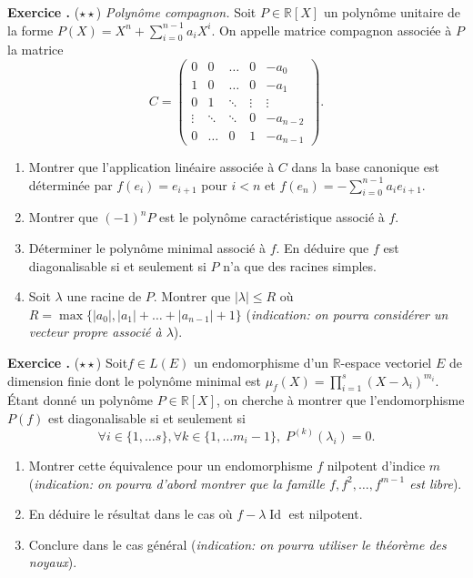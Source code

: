\documentclass[10pt,a4paper]{article}
\def\bf#1{\textbf{#1}}
\newcounter{nexo}
\newcommand{\exo}{\medskip\noindent \bf{ Exercice \thenexo. \stepcounter{nexo}}}
\def\be{\begin{enumerate}}
\def\ee{\end{enumerate}}
\def\R{\mathbb{R}}
\def\mat#1{\begin{pmatrix}#1\end{pmatrix}}
\DeclareMathOperator{\Id}{Id}
\begin{document}
\exo($\star \star$) \emph{Polynôme compagnon.}
Soit $P \in \R[X]$ un polynôme unitaire de la forme $P(X) = X^n+ \sum_{i=0}^{n-1} a_i X^i$. 
On appelle matrice compagnon associée à $P$ la matrice 
\[C =  \mat{
0 & 0 & \ldots & 0 & -a_0\\
1 & 0&   \ldots & 0&-a_1\\
0 & 1&  \ddots  &  \vdots  &\vdots\\
\vdots & \ddots & \ddots & 0 & -a_{n-2}\\
0& \ldots & 0 &1&-a_{n-1}}.\]
\be
\item
Montrer que l'application linéaire associée à $C$ dans la base canonique est déterminée par $f(e_i) = e_{i+1}$ pour $i<n$ et $f(e_n) = - \sum_{i=0}^{n-1} a_i e_{i+1}$.
\item 
Montrer que $(-1)^n P$ est le polynôme caractéristique associé à $f$.
\item
Déterminer le polynôme minimal associé à $f$. En déduire que $f$ est diagonalisable si et seulement si $P$ n'a que des racines simples.
\item 
Soit $\lambda$ une racine de $P$. Montrer que $|\lambda| \leq R$ où $R = \max\{|a_0|,|a_1|+\ldots+|a_{n-1}|+1\}$ (\emph{indication: on pourra considérer un 
vecteur propre associé à $\lambda$}).
\ee

\exo($\star \star$)
Soit$f \in L(E)$ un endomorphisme d'un $\R$-espace vectoriel $E$ de dimension finie dont le polynôme minimal est $\mu_f(X) = \prod_{i=1}^s(X-\lambda_i)^{m_i}$. 
\'Etant donné un polynôme $P \in \R[X]$, on cherche à montrer que l'endomorphisme $P(f)$ est diagonalisable si et seulement si 
\[\forall i\in \{1, \ldots s\}, \forall k\in \{1, \ldots m_i-1\}, \; P^{(k)}(\lambda_i) = 0.\]
 \be
\item Montrer cette équivalence pour un endomorphisme $f$ nilpotent d'indice $m$ 
(\emph{indication: on pourra d'abord montrer que la famille $f, f^2, \ldots, f^{m-1}$ est libre}).
\item En déduire le résultat dans le cas où $f- \lambda \Id$ est nilpotent.
\item Conclure dans le cas général (\emph{indication: on pourra utiliser le théorème des noyaux}).
\ee
\end{document}
